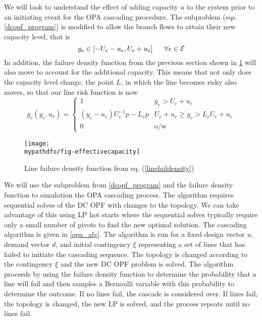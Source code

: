 We will look to understand the effect of adding capacity $u$ to the system prior to an initiating event for the OPA cascading procedure.  The subproblem (eqs. \ref{dcopf_program}) is modified to allow the branch flows to attain their new capacity level, that is
\begin{equation}
 y_e  \in \left[ - U_e - u_e, U_e + u_e \right]    \hspace{15px} \forall e \in \cE
\end{equation}
In addition, the failure density function from the previous section shown in \cref{cdf} will also move to account for the additional capacity.  This means that not only does the capacity level change, the point $L$, in which the line becomes risky also moves, so that our line risk function is now
\begin{equation}\label{linefaildensity}
g_e(y_e,u_e) = \left\{ \begin{array}{ll}
1 & y_e > U_e + u_e \\
(y_e-u_e)U_e^{-1}p - L_e p & U_e + u_e \geq y_e > L_e U_e + u_e \\
0 & \mbox{o/w}
\end{array}
\right. 
\end{equation}

\begin{figure}
\centering
\texttt{[image: \\mypathdfo/fig-effectivecapacity]}
\caption{ Line failure density function from eq. (\ref{linefaildensity}) }
\label{cdf}
\end{figure}


We will use the subproblem from \cref{dcopf_program} and the failure density function to simulation the OPA cascading process.  The algorithm requires sequential solves of the DC OPF with changes to the topology. We can take advantage of this using LP hot starts where the sequential solves typically require only a small number of pivots to find the new optimal solution.  The cascading algorithm is given in \cref{opa_alg}.  The algorithm is run for a fixed design vector $u$, demand vector $d$, and initial contingency $\xi$ representing a set of lines that has failed to initiate the cascading sequence.  The topology is changed according to the contingency $\xi$ and the new DC OPF problem is solved.  The algorithm proceeds by using the failure density function to determine the probability that a line will fail and then samples a Bernoulli variable with this probability to determine the outcome.  If no lines fail, the cascade is considered over.  If lines fail, the topology is changed, the new LP is solved, and the process repeats until no lines fail.


